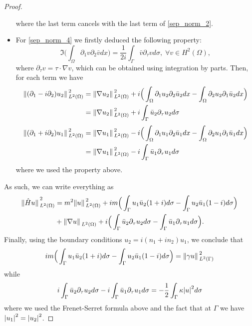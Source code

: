 \begin{proof}
\begin{itemize}
\[                \]
                where the last term cancels with the last term of \eqref{sep_norm_2}.
        \item For \eqref{sep_norm_4} we firstly deduced the following property:
                \[
                \Im \Big(\int_\Omega \partial_1 v \partial_2 \bar{v}dx\Big) = \frac{1}{2 i} \int_{\Gamma} \bar{v} \partial_\tau v d \sigma, \; \forall v \in H^2(\Omega),
                \]
                where \(\partial_\tau v= \tau \cdot \nabla v\), which can be obtained using integration by parts.
                Then, for each term we have
                \begin{align*}
                \norm*{(\partial_1 - i \partial_2)u_2}_{L^2(\Omega)}^2 &= \norm*{\nabla u_2}_{L^2(\Omega)}^2 + i \Big(\int_\Omega \partial_1 u_2 \partial_2 \bar{u}_2dx - \int_\Omega \partial_2 u_2 \partial_1 \bar{u}_2dx\Big)\\
                & = \norm*{\nabla u_2}_{L^2(\Omega)}^2 + i\int_{\Gamma} \bar{u}_2 \partial_\tau u_2 d \sigma
                \end{align*}
                \vspace*{-1cm}
                \begin{align*}
                \norm*{(\partial_1 + i \partial_2)u_1}_{L^2(\Omega)}^2 &= \norm*{\nabla u_1}_{L^2(\Omega)}^2 - i \Big(\int_\Omega \partial_1 u_1 \partial_2 \bar{u}_1dx - \int_\Omega \partial_2 u_1 \partial_1 \bar{u}_1dx\Big)\\
                & = \norm*{\nabla u_1}_{L^2(\Omega)}^2 - i\int_{\Gamma} \bar{u}_1 \partial_\tau u_1 d \sigma
                \end{align*}
                where we used the property above.
    \end{itemize}
    As such, we can write everything as
    \begin{align*}
        \norm*{\hat{H}u}_{L^2(\Omega)}^2 &= m^2 \norm*{u}_{L^2(\Omega)}^2 + i m \Big(\int_{\Gamma} u_1\bar{u}_2(1+i)d\sigma - \int_{\Gamma} u_2\bar{u}_1(1-i)d\sigma \Big)\\
        & + \norm*{\nabla u}_{L^2(\Omega)} + i\Big( \int_{\Gamma} \bar{u}_2 \partial_\tau u_2 d \sigma -  \int_{\Gamma} \bar{u}_1 \partial_\tau u_1 d \sigma \Big).
    \end{align*}
    Finally, using the boundary conditions \(u_2 = i(n_1 + i n_2)u_1\), we conclude that
    \begin{align*}
    i m \Big(\int_{\Gamma} u_1\bar{u}_2(1+i)d\sigma - \int_{\Gamma} u_2\bar{u}_1(1-i)d\sigma \Big) = \norm*{\gamma u}_{L^2(\Gamma)}^2
    \end{align*}
    while
    \begin{align*}
    i\int_{\Gamma} \bar{u}_2 \partial_\tau u_2 d \sigma -  i\int_{\Gamma} \bar{u}_1 \partial_\tau u_1 d \sigma = -\frac{1}{2}\int_{\Gamma}\kappa \abs{u}^2 d\sigma
    \end{align*}
    where we used the Frenet-Serret formula above and the fact that at \(\Gamma\) we have \(\abs{u_1}^2=\abs{u_2}^2\).
\end{proof}

